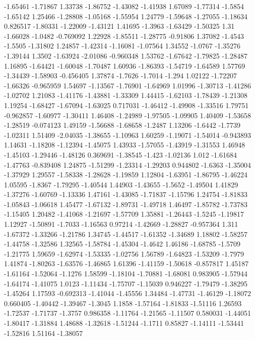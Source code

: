 \documentclass[9pt]{article}
\theoremstyle{plain}
\theoremstyle{definition}
\theoremstyle{remark}
\numberwithin{equation}{section}
\begin{document}
-1.65461
-1.71867
1.33738
-1.86752
-1.43082
-1.41938
1.67089
-1.77314
-1.5854
-1.65142
1.25466
-1.28808
-1.05168
-1.55954
1.24779
-1.59648
-1.27055
-1.18634
0.826517
-1.80331
-1.22009
-1.43121
1.41695
-1.3963
-1.63429
-1.50325
1.31
-1.66028
-1.0482
-0.769092
1.22928
-1.85511
-1.28775
-0.91806
1.37082
-1.4543
-1.5505
-1.31802
1.24857
-1.42314
-1.16081
-1.07564
1.34552
-1.0767
-1.35276
-1.39144
1.3502
-1.63924
-2.01086
-0.960348
1.53762
-1.67642
-1.79825
-1.28487
1.16895
-1.64421
-1.60048
-1.70487
1.60936
-1.86393
-1.54719
-1.64589
1.57769
-1.34439
-1.58903
-0.456405
1.37874
-1.7626
-1.7014
-1.294
1.02122
-1.72207
-1.66326
-0.965959
1.54697
-1.13567
-1.76901
-1.64969
1.01996
-1.30713
-1.41286
-1.02702
1.21083
-1.41176
-1.43881
-1.33309
1.44415
-1.62103
-1.78439
-1.21308
1.19254
-1.68427
-1.67094
-1.63025
0.717031
-1.46412
-1.49908
-1.33516
1.79751
-0.962857
-1.60977
-1.30411
1.46408
-1.24989
-1.97505
-1.09905
1.40409
-1.53658
-1.28519
-0.074123
1.49159
-1.56688
-1.68658
-1.2487
1.13206
-1.6442
-1.7739
-1.02311
1.51409
-2.04035
-1.38655
-1.10963
1.60259
-1.19071
-1.54014
-0.943893
1.14631
-1.18208
-1.12394
-1.45075
1.43933
-1.57055
-1.43919
-1.31553
1.46948
-1.45103
-1.29446
-1.48126
0.369691
-1.38545
-1.423
-1.02136
1.012
-1.61684
-1.47763
-0.839408
1.24875
-1.51299
-1.23314
-1.29203
0.944802
-1.6363
-1.35004
-1.37929
1.29557
-1.58338
-1.28628
-1.19859
1.12804
-1.63951
-1.86795
-1.46224
1.05595
-1.8367
-1.79295
-1.40544
1.44903
-1.43655
-1.5652
-1.49504
1.41829
-1.37276
-1.60769
-1.13336
1.47161
-1.43085
-1.71837
-1.15796
1.24754
-1.81833
-1.05843
-1.06618
1.45477
-1.67132
-1.89731
-1.49718
1.46497
-1.85782
-1.73783
-1.15405
1.20482
-1.41068
-1.21697
-1.57709
1.35881
-1.26443
-1.5245
-1.19817
1.12927
-1.50891
-1.7033
-1.16563
0.97214
-1.42669
-1.28827
-0.957364
1.311
-1.67372
-1.33266
-1.21786
1.34745
-1.44517
-1.61352
-1.34689
1.18802
-1.58257
-1.44758
-1.32586
1.32565
-1.58784
-1.45304
-1.4642
1.46186
-1.68785
-1.5709
-1.21775
1.59659
-1.62974
-1.53335
-1.02756
1.56789
-1.64823
-1.53209
-1.7979
1.41874
-1.80263
-1.63576
-1.46865
1.61396
-1.41159
-1.50618
-0.857817
1.45187
-1.61164
-1.52064
-1.1276
1.58599
-1.18104
-1.70881
-1.68081
0.983905
-1.57944
-1.64174
-1.41075
1.0123
-1.11434
-1.75707
-1.15039
0.946227
-1.79479
-1.38295
-1.45264
1.17593
-0.692313
-1.41044
-1.45556
1.34484
-1.47731
-1.46129
-1.18072
0.660405
-1.40442
-1.39467
-1.3045
1.1858
-1.57164
-1.81833
-1.51116
1.26593
-1.72537
-1.71737
-1.3757
0.986358
-1.11764
-1.21565
-1.11507
0.580031
-1.44051
-1.80417
-1.31884
1.48688
-1.32618
-1.51244
-1.1711
0.85827
-1.14111
-1.53441
-1.52816
1.51164
-1.38057
\end{document}
